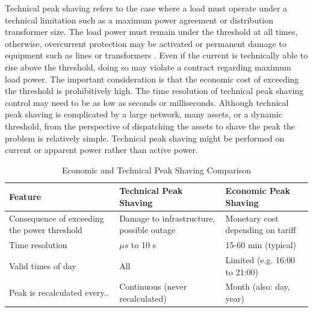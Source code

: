 \documentclass[journal,article,submit,pdftex,moreauthors]{Definitions/mdpi}
\begin{document}
Technical peak shaving refers to the case where a load must operate under a technical limitation such as a maximum power agreement or distribution transformer size. The load power must remain under the threshold at all times, otherwise, overcurrent protection may be activated or permanent damage to equipment such as lines or transformers \cite{Greco2023}. Even if the current is technically able to rise above the threshold, doing so may violate a contract regarding maximum load power. The important consideration is that the economic cost of exceeding the threshold is prohibitively high. The time resolution of technical peak shaving control may need to be as low as seconds or milliseconds. Although technical peak shaving is complicated by a large network, many assets, or a dynamic threshold, from the perspective of dispatching the assets to shave the peak the problem is relatively simple. Technical peak shaving might be performed on current or apparent power rather than active power.

\begin{table}
  \centering
  \caption{Economic and Technical Peak Shaving Comparison}
  \label{tab:econ-tech-peak-shaving}
  \begin{tabularx}{\linewidth}{X X X}
    \toprule
    Feature                                      & Technical Peak Shaving                    & Economic Peak Shaving             \\
    \midrule
    Consequence of exceeding the power threshold & Damage to infrastructure, possible outage & Monetary cost depending on tariff \\
    Time resolution                              & $\mu s$ to 10 s                           & 15-60 min (typical)               \\
    Valid times of day                           & All                                       & Limited (e.g. 16:00 to 21:00)     \\
    Peak is recalculated every..                 & Continuous (never recalculated)           & Month (also: day, year)           \\
    \bottomrule
  \end{tabularx}
\end{table}

\end{document}
